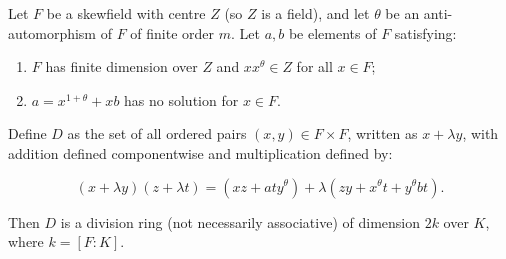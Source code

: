 Let $F$ be a skewfield with centre $Z$ (so $Z$ is a field), and let $\theta$ be an anti-automorphism of $F$ of finite order $m$. Let $a, b$ be elements of $F$ satisfying:

\begin{enumerate}
\item[(1)] $F$ has finite dimension over $Z$ and $xx^{\theta} \in Z$ for all $x \in F$;
\item[(2)] $a = x^{1+\theta} + xb$ has no solution for $x \in F$.
\end{enumerate}

Define $D$ as the set of all ordered pairs $(x, y) \in F \times F$, written as $x + \lambda y$, with addition defined componentwise and multiplication defined by:

$$(x + \lambda y)(z + \lambda t) = (xz + aty^{\theta}) + \lambda(zy + x^{\theta}t + y^{\theta}bt).$$

Then $D$ is a division ring (not necessarily associative) of dimension $2k$ over $K$, where $k = [F : K]$.
